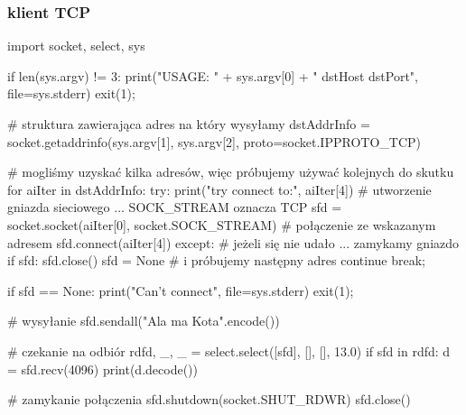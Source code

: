 \documentclass{pdfBooklets}
\begin{document}
\subsubsection{klient TCP}
\begin{CodeFrame*}[python]{}
import socket, select, sys

if len(sys.argv) != 3:
	print("USAGE: " + sys.argv[0] + " dstHost dstPort", file=sys.stderr)
	exit(1);

# struktura zawierająca adres na który wysyłamy
dstAddrInfo = socket.getaddrinfo(sys.argv[1], sys.argv[2], proto=socket.IPPROTO_TCP)

# mogliśmy uzyskać kilka adresów, więc próbujemy używać kolejnych do skutku
for aiIter in dstAddrInfo:
	try:
		print("try connect to:", aiIter[4])
		# utworzenie gniazda sieciowego ... SOCK_STREAM oznacza TCP
		sfd = socket.socket(aiIter[0], socket.SOCK_STREAM)
		# połączenie ze wskazanym adresem
		sfd.connect(aiIter[4])
	except:
		# jeżeli się nie udało ... zamykamy gniazdo
		if sfd:
			sfd.close()
		sfd = None
		# i próbujemy następny adres
		continue
	break;

if sfd == None:
	print("Can't connect", file=sys.stderr)
	exit(1);

# wysyłanie
sfd.sendall("Ala ma Kota\n".encode())

# czekanie na odbiór
rdfd, _, _ = select.select([sfd], [], [], 13.0)
if sfd in rdfd:
	d = sfd.recv(4096)
	print(d.decode())

# zamykanie połączenia
sfd.shutdown(socket.SHUT_RDWR)
sfd.close()
\end{CodeFrame*}
\end{document}
